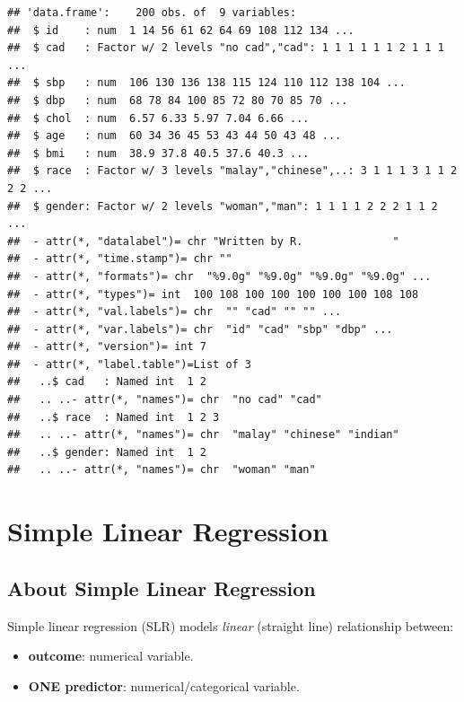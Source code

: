 \documentclass[
  10pt,
]{krantz}
\providecommand{\tightlist}{%
  \setlength{\itemsep}{0pt}\setlength{\parskip}{0pt}}
\begin{document}
\begin{verbatim}
## 'data.frame':    200 obs. of  9 variables:
##  $ id    : num  1 14 56 61 62 64 69 108 112 134 ...
##  $ cad   : Factor w/ 2 levels "no cad","cad": 1 1 1 1 1 1 2 1 1 1 ...
##  $ sbp   : num  106 130 136 138 115 124 110 112 138 104 ...
##  $ dbp   : num  68 78 84 100 85 72 80 70 85 70 ...
##  $ chol  : num  6.57 6.33 5.97 7.04 6.66 ...
##  $ age   : num  60 34 36 45 53 43 44 50 43 48 ...
##  $ bmi   : num  38.9 37.8 40.5 37.6 40.3 ...
##  $ race  : Factor w/ 3 levels "malay","chinese",..: 3 1 1 1 3 1 1 2 2 2 ...
##  $ gender: Factor w/ 2 levels "woman","man": 1 1 1 1 2 2 2 1 1 2 ...
##  - attr(*, "datalabel")= chr "Written by R.              "
##  - attr(*, "time.stamp")= chr ""
##  - attr(*, "formats")= chr  "%9.0g" "%9.0g" "%9.0g" "%9.0g" ...
##  - attr(*, "types")= int  100 108 100 100 100 100 100 108 108
##  - attr(*, "val.labels")= chr  "" "cad" "" "" ...
##  - attr(*, "var.labels")= chr  "id" "cad" "sbp" "dbp" ...
##  - attr(*, "version")= int 7
##  - attr(*, "label.table")=List of 3
##   ..$ cad   : Named int  1 2
##   .. ..- attr(*, "names")= chr  "no cad" "cad"
##   ..$ race  : Named int  1 2 3
##   .. ..- attr(*, "names")= chr  "malay" "chinese" "indian"
##   ..$ gender: Named int  1 2
##   .. ..- attr(*, "names")= chr  "woman" "man"
\end{verbatim}

\hypertarget{simple-linear-regression}{%
\section{\texorpdfstring{Simple Linear Regression}{Simple Linear Regression}}\label{simple-linear-regression}}

\hypertarget{about-simple-linear-regression}{%
\subsection{\texorpdfstring{About Simple Linear Regression}{About Simple Linear Regression}}\label{about-simple-linear-regression}}

Simple linear regression (SLR) models \emph{linear} (straight line) relationship between:

\begin{itemize}
\tightlist
\item
  \textbf{outcome}: numerical variable.
\item
  \textbf{ONE predictor}: numerical/categorical variable.
\end{itemize}
\end{document}
